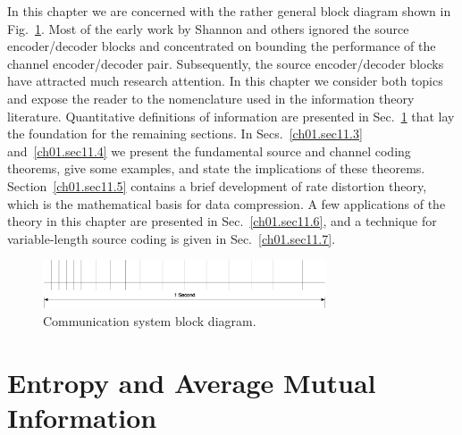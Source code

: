 In this chapter we are concerned with the rather general block diagram
shown in Fig.~\ref{ch01.fig11.1.1}. Most of the early work by
Shannon and others ignored the source  encoder/decoder blocks and
concentrated  on bounding the performance of the channel
encoder/decoder pair. Subsequently, the source  encoder/decoder blocks
have attracted much research attention.  In this chapter we consider
both topics and expose the reader to the nomenclature used in the
information theory literature.
Quantitative definitions of information are presented in
Sec.~\ref{ch01.sec11.2} that lay the foundation for the remaining
sections. In Secs.~\ref{ch01.sec11.3} and~\ref{ch01.sec11.4} we present
the fundamental source and channel coding theorems, give some examples,
and state the implications of these theorems.
Section~\ref{ch01.sec11.5} contains a brief development of rate
distortion theory,
which is the mathematical basis for data compression.
A few applications of the theory in this chapter are presented
in Sec.~\ref{ch01.sec11.6}, and a technique for variable-length
source coding is given in Sec.~\ref{ch01.sec11.7}.


\begin{figure}[hbt] %
  \centering
  \includegraphics[width=3.3in]{line-spaces.eps}
\caption{Communication system block diagram.
\label{ch01.fig11.1.1} }
\end{figure}


\section{Entropy and Average Mutual Information}
\label{ch01.sec11.2}

